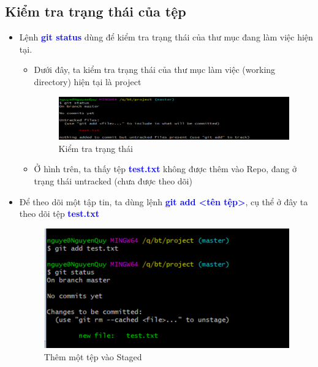 \documentclass[12pt,a4paper]{report}
\begin{document}
\subsection{Kiểm tra trạng thái của tệp}
\begin{itemize}
\item Lệnh \textcolor{blue}{\bf git status} dùng để kiểm tra trạng thái của thư mục đang làm việc hiện tại.
	\begin{itemize}
		\item Dưới đây, ta kiểm tra trạng thái của thư mục làm việc (working directory) hiện tại là project

\begin{figure}[!ht]
	\centering	
	\includegraphics[width=0.8\linewidth]{screenshot007}
\caption{Kiểm tra trạng thái}
	\label{fig:screenshot007}
\end{figure}

		\item Ở hình trên, ta thấy tệp \textcolor{blue}{\bf test.txt} không được thêm vào Repo, đang ở trạng thái untracked (chưa được theo dõi)
	\end{itemize}
\item Để theo dõi một tập tin, ta dùng lệnh \textcolor{blue}{\bf git add <tên tệp>}, cụ thể ở đây ta theo dõi tệp \textcolor{blue}{\bf test.txt}

\begin{figure}[!ht]
	\centering
	\includegraphics[width=0.8\linewidth]{screenshot008}
\caption{Thêm một tệp vào Staged}
	\label{fig:screenshot008}
	\end{figure}
\end{itemize}
\end{document}
